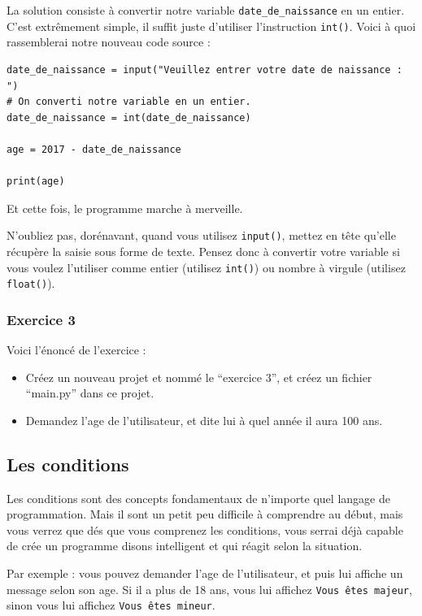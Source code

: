 \documentclass[12pt]{article}
\newcommand{\code}[1]{\colorbox{light-gray}{\texttt{#1}}}
\begin{document}
            La solution consiste à convertir notre variable \code{date\_de\_naissance} en un entier. C'est extrêmement
            simple, il suffit juste d'utiliser l'instruction \code{int()}. Voici à quoi rassemblerai notre nouveau
            code source :
            \begin{lstlisting}[style=code, breaklines=false]
date_de_naissance = input("Veuillez entrer votre date de naissance : ")
# On converti notre variable en un entier.
date_de_naissance = int(date_de_naissance)

age = 2017 - date_de_naissance

print(age)
            \end{lstlisting}

            Et cette fois, le programme marche à merveille.

            N'oubliez pas, dorénavant, quand vous utilisez \code{input()},
            mettez en tête qu'elle récupère la saisie sous forme de texte. Pensez donc à convertir votre variable si
            vous voulez l'utiliser comme entier (utilisez \code{int()}) ou nombre à virgule (utilisez \code{float()}).

        \subsubsection{Exercice 3}
            Voici l'énoncé de l'exercice :
            \begin{itemize}
                \item Créez un nouveau projet et nommé le ``exercice 3'', et créez un fichier ``main.py'' dans ce
                    projet.
                \item Demandez l'age de l'utilisateur, et dite lui à quel année il aura 100 ans.
            \end{itemize}

\clearpage

    \subsection{Les conditions}
        Les conditions sont des concepts fondamentaux de n'importe quel langage de programmation. Mais il sont un petit
        peu difficile à comprendre au début, mais vous verrez que dés que vous comprenez les conditions, vous serrai
        déjà capable de crée un programme disons intelligent et qui réagit selon la situation.

        Par exemple : vous pouvez demander l'age de l'utilisateur, et puis lui affiche un message selon son age. Si il a
        plus de 18 ans, vous lui affichez \code{Vous êtes majeur}, sinon vous lui affichez \code{Vous êtes mineur}.
\end{document}
